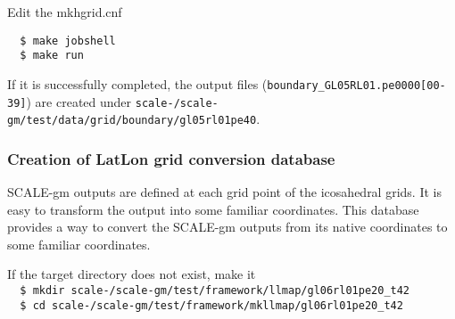 Edit the mkhgrid.cnf

\vspace{-4mm}
\begin{verbatim}
  $ make jobshell
  $ make run
\end{verbatim}
If it is successfully completed, the output files ({\verb|boundary_GL05RL01.pe0000[00-39]|}) are
created under \verb|scale-|{\version}\verb|/scale-gm/test/data/grid/boundary/gl05rl01pe40|.


\subsubsection{Creation of LatLon grid conversion database}
SCALE-gm outputs are defined at each grid point of the icosahedral grids.
It is easy to transform the output into some familiar coordinates.
This database provides a way to convert the SCALE-gm outputs from its native
coordinates to some familiar coordinates.

If the target directory does not exist, make it \\
\verb|  $ mkdir scale-|{\version}\verb|/scale-gm/test/framework/llmap/gl06rl01pe20_t42| \\
\verb|  $ cd scale-|{\version}\verb|/scale-gm/test/framework/mkllmap/gl06rl01pe20_t42|  \\

